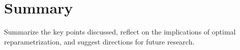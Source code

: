 \section{Summary}
\label{subsec:summary-reparam}
Summarize the key points discussed, reflect on the implications of optimal reparametrization, and suggest directions for future research.
